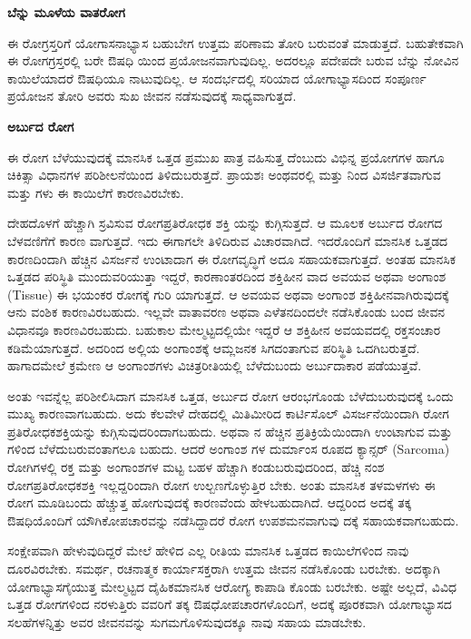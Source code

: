 \textbf{ಬೆನ್ನು ಮೂಳೆಯ ವಾತರೋಗ} 

ಈ ರೋಗ್ರಸ್ತರಿಗೆ ಯೋಗಾಸನಾಭ್ಯಾಸ ಬಹುಬೇಗ ಉತ್ತಮ ಪರಿಣಾಮ ತೋರಿ ಬರುವಂತೆ ಮಾಡುತ್ತದೆ. ಬಹುತೇಕವಾಗಿ ಈ ರೋಗಗ್ರಸ್ತರಲ್ಲಿ ಬರೇ ಔಷಧಿ ಯಿಂದ ಪ್ರಯೋಜನವಾಗುವುದಿಲ್ಲ. ಅದರಲ್ಲೂ ಪದೇಪದೇ ಬರುವ ಬೆನ್ನು ನೋವಿನ ಕಾಯಿಲೆಯಾದರೆ ಔಷಧಿಯೂ ನಾಟುವುದಿಲ್ಲ. ಆ ಸಂದರ್ಭದಲ್ಲಿ ಸರಿಯಾದ ಯೋಗಾಭ್ಯಾಸದಿಂದ ಸಂಪೂರ್ಣ ಪ್ರಯೋಜನ ತೋರಿ ಅವರು ಸುಖ ಜೀವನ ನಡೆಸುವುದಕ್ಕೆ ಸಾಧ್ಯವಾಗುತ್ತದೆ.

\textbf{ಅರ್ಬುದ ರೋಗ} 

ಈ ರೋಗ ಬೆಳೆಯುವುದಕ್ಕೆ ಮಾನಸಿಕ ಒತ್ತಡ ಪ್ರಮುಖ ಪಾತ್ರ ವಹಿಸುತ್ತ ದೆಂಬುದು ವಿಭಿನ್ನ ಪ್ರಯೋಗಗಳ ಹಾಗೂ ಚಿಕಿತ್ಸಾ ವಿಧಾನಗಳ ಪರಿಶೀಲನೆಯಿಂದ ತಿಳಿದುಬರುತ್ತದೆ. ಪ್ರಾಯಶಃ ಅಂಥವರಲ್ಲಿ  ಮತ್ತು  ನಿಂದ ವಿಸರ್ಜಿತವಾಗುವ  ಮತ್ತು  ಗಳು ಈ ಕಾಯಿಲೆಗೆ ಕಾರಣವಿರಬೇಕು.

ದೇಹದೊಳಗೆ ಹೆಚ್ಚಾಗಿ ಸ್ರವಿಸುವ  ರೋಗಪ್ರತಿರೋಧಕ ಶಕ್ತಿ ಯನ್ನು ಕುಗ್ಗಿಸುತ್ತದೆ. ಆ ಮೂಲಕ ಅರ್ಬುದ ರೋಗದ ಬೆಳವಣಿಗೆಗೆ ಕಾರಣ ವಾಗುತ್ತದೆ. ಇದು ಈಗಾಗಲೇ ತಿಳಿದಿರುವ ವಿಚಾರವಾಗಿದೆ. ಇದರೊಂದಿಗೆ ಮಾನಸಿಕ ಒತ್ತಡದ ಕಾರಣದಿಂದಾಗಿ ಹೆಚ್ಚಿನ  ವಿಸರ್ಜನೆ ಉಂಟಾದಾಗ ಈ ರೋಗವೃದ್ಧಿಗೆ ಅದೂ ಸಹಾಯಕವಾಗುತ್ತದೆ. ಅಂತಹ ಮಾನಸಿಕ ಒತ್ತಡದ ಪರಿಸ್ಥಿತಿ ಮುಂದುವರಿಯುತ್ತಾ ಇದ್ದರೆ, ಕಾರಣಾಂತರದಿಂದ ಶಕ್ತಿಹೀನ ವಾದ ಅವಯವ ಅಥವಾ ಅಂಗಾಂಶ (Tissue) ಈ ಭಯಂಕರ ರೋಗಕ್ಕೆ ಗುರಿ ಯಾಗುತ್ತದೆ. ಆ ಅವಯವ ಅಥವಾ ಅಂಗಾಂಶ ಶಕ್ತಿಹೀನವಾಗಿರುವುದಕ್ಕೆ ಆನು ವಂಶಿಕ ಕಾರಣವಿರಬಹುದು. ಇಲ್ಲವೇ ವಾತಾವರಣ ಅಥವಾ ಎಳೆತನದಿಂದಲೇ ನಡೆಸಿಕೊಂಡು ಬಂದ ಜೀವನ ವಿಧಾನವೂ ಕಾರಣವಿರಬಹುದು. ಬಹುಕಾಲ  ಮೇಲ್ಮಟ್ಟದಲ್ಲಿಯೇ ಇದ್ದರೆ ಆ ಶಕ್ತಿಹೀನ ಅವಯವದಲ್ಲಿ ರಕ್ತಸಂಚಾರ ಕಡಿಮೆಯಾಗುತ್ತದೆ. ಅದರಿಂದ ಅಲ್ಲಿಯ ಅಂಗಾಂಶಕ್ಕೆ ಆಮ್ಲಜನಕ ಸಿಗದಂತಾಗುವ ಪರಿಸ್ಥಿತಿ  ಒದಗಿಬರುತ್ತದೆ. ಹಾಗಾದಮೇಲೆ ಕ್ರಮೇಣ ಆ ಅಂಗಾಂಶಗಳು ವಿಚಿತ್ರರೀತಿಯಲ್ಲಿ ಬೆಳೆದುಬಂದು ಅರ್ಬುದಾಕಾರ ಪಡೆಯುತ್ತವೆ.

ಅಂತು ಇವನ್ನೆಲ್ಲ ಪರಿಶೀಲಿಸಿದಾಗ ಮಾನಸಿಕ ಒತ್ತಡ, ಅರ್ಬುದ ರೋಗ ಆರಂಭಗೊಂಡು ಬೆಳೆದುಬರುವುದಕ್ಕೆ ಒಂದು ಮುಖ್ಯ ಕಾರಣವಾಗಬಹುದು. ಅದು ಕೆಲವೇಳೆ ದೇಹದಲ್ಲಿ ಮಿತಿಮೀರಿದ ಕಾರ್ಟಿಸೊಲ್ ವಿಸರ್ಜನೆಯಿಂದಾಗಿ ರೋಗ ಪ್ರತಿರೋಧಕಶಕ್ತಿಯನ್ನು ಕುಗ್ಗಿಸುವುದರಿಂದಾಗಬಹುದು. ಅಥವಾ  ನ ಹೆಚ್ಚಿನ ಪ್ರತಿಕ್ರಿಯೆಯಿಂದಾಗಿ ಉಂಟಾಗುವ  ಮತ್ತು  ಗಳಿಂದ ಬೆಳೆದುಬರುವಂತಾಗಲೂ ಬಹುದು. ಆದರೆ ಅಂಗಾಂಶ ಗಳ ದುರ್ಮಾಂಸ ರೂಪದ ಕ್ಯಾನ್ಸರ್ (Sarcoma) ರೋಗಿಗಳಲ್ಲಿ ರಕ್ತ ಮತ್ತು ಅಂಗಾಂಶಗಳ  ಮಟ್ಟ ಬಹಳ ಹೆಚ್ಚಾಗಿ ಕಂಡುಬರುವುದರಿಂದ, ಹೆಚ್ಚಿ ನಂಶ ರೋಗಪ್ರತಿರೋಧಕಶಕ್ತಿ ಇಲ್ಲದ್ದರಿಂದಾಗಿ ರೋಗ ಉಲ್ಬಣಗೊಳ್ಳುತ್ತಿರ ಬೇಕು. ಅಂತು ಮಾನಸಿಕ ತಳಮಳಗಳು ಈ ರೋಗ ಮೂಡಿಬಂದು ಹೆಚ್ಚುತ್ತ ಹೋಗುವುದಕ್ಕೆ ಕಾರಣವೆಂದು ಹೇಳಬಹುದಾಗಿದೆ. ಆದ್ದರಿಂದ ಅದಕ್ಕೆ ತಕ್ಕ ಔಷಧಿಯೊಂದಿಗೆ ಯೌಗಿಕೋಪಚಾರವನ್ನು ನಡೆಸಿದ್ದಾದರೆ ರೋಗ ಉಪಶಮನವಾಗುವು ದಕ್ಕೆ ಸಹಾಯಕವಾಗಬಹುದು.

ಸಂಕ್ಷೇಪವಾಗಿ ಹೇಳುವುದಿದ್ದರೆ ಮೇಲೆ ಹೇಳಿದ ಎಲ್ಲ ರೀತಿಯ ಮಾನಸಿಕ ಒತ್ತಡದ ಕಾಯಿಲೆಗಳಿಂದ ನಾವು ದೂರವಿರಬೇಕು. ಸಮರ್ಥ, ರಚನಾತ್ಮಕ ಕಾರ್ಯಾಸಕ್ತರಾಗಿ ಉತ್ತಮ ಜೀವನ ನಡೆಸಿಕೊಂಡು ಬರಬೇಕು. ಅದಕ್ಕಾಗಿ ಯೋಗಾಭ್ಯಾಸಗೈಯುತ್ತ ಮೇಲ್ಮಟ್ಟದ ದೈಹಿಕಮಾನಸಿಕ ಆರೋಗ್ಯ ಕಾಪಾಡಿ ಕೊಂಡು ಬರಬೇಕು. ಅಷ್ಟೇ ಅಲ್ಲದೆ, ವಿವಿಧ ಒತ್ತಡ ರೋಗಗಳಿಂದ ನರಳುತ್ತಿರು ವವರಿಗೆ ತಕ್ಕ ಔಷಧೋಪಚಾರಗಳೊಂದಿಗೆ, ಅದಕ್ಕೆ ಪೂರಕವಾಗಿ ಯೋಗಾಭ್ಯಾಸದ ಸಲಹೆಗಳನ್ನಿತ್ತು ಅವರ ಜೀವನವನ್ನು ಸುಗಮಗೊಳಿಸುವುದಕ್ಕೂ ನಾವು ಸಹಾಯ ಮಾಡಬೇಕು.

